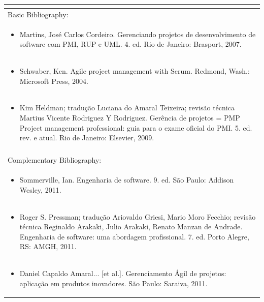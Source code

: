 \documentclass[11pt]{article}
\begin{document}
\begin{center}
\begin{longtable}{|p{4cm}|p{4cm}|p{4cm}|p{4cm}|}
\multicolumn{4}{|p{\dimexpr 16cm + 6\tabcolsep\relax}|}{}\\
\hline
\multicolumn{4}{|p{16cm}|}{Basic Bibliography:}\\*
\multicolumn{4}{|p{\dimexpr 16cm + 6\tabcolsep\relax}|}{\begin{itemize}\item Martins, José Carlos Cordeiro. Gerenciando projetos de desenvolvimento de software com PMI, RUP e UML. 4. ed. Rio de Janeiro: Brasport, 2007.\end{itemize}}\\
\multicolumn{4}{|p{\dimexpr 16cm + 6\tabcolsep\relax}|}{\begin{itemize}\item Schwaber, Ken. Agile project management with Scrum. Redmond, Wash.: Microsoft Press, 2004.\end{itemize}}\\
\multicolumn{4}{|p{\dimexpr 16cm + 6\tabcolsep\relax}|}{\begin{itemize}\item Kim Heldman; tradução Luciana do Amaral Teixeira; revisão técnica Martius Vicente Rodriguez Y Rodriguez. Gerência de projetos = PMP Project management professional: guia para o exame oficial do PMI. 5. ed. rev. e atual. Rio de Janeiro: Elsevier, 2009.\end{itemize}}\\
\multicolumn{4}{|p{16cm}|}{}\\
\hline
\multicolumn{4}{|p{16cm}|}{Complementary Bibliography:}\\*
\multicolumn{4}{|p{\dimexpr 16cm + 6\tabcolsep\relax}|}{\begin{itemize}\item Sommerville, Ian. Engenharia de software. 9. ed. São Paulo: Addison Wesley, 2011.\end{itemize}}\\
\multicolumn{4}{|p{\dimexpr 16cm + 6\tabcolsep\relax}|}{\begin{itemize}\item Roger S. Pressman; tradução Ariovaldo Griesi, Mario Moro Fecchio; revisão técnica Reginaldo Arakaki, Julio Arakaki, Renato Manzan de Andrade. Engenharia de software: uma abordagem profissional. 7. ed. Porto Alegre, RS: AMGH, 2011.\end{itemize}}\\
\multicolumn{4}{|p{\dimexpr 16cm + 6\tabcolsep\relax}|}{\begin{itemize}\item Daniel Capaldo Amaral... [et al.]. Gerenciamento Ágil de projetos: aplicação em produtos inovadores. São Paulo: Saraiva, 2011.\end{itemize}}\\

\end{longtable}
\end{center}
\end{document}
